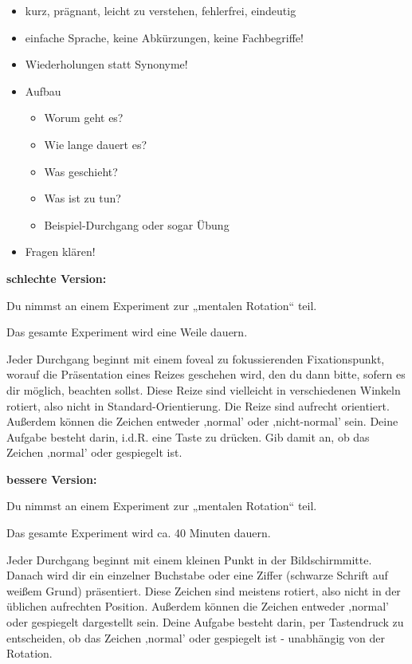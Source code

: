 \documentclass[
]{book}
\begin{document}
\begin{itemize}
\item
  kurz, prägnant, leicht zu verstehen, fehlerfrei, eindeutig
\item
  einfache Sprache, keine Abkürzungen, keine Fachbegriffe!
\item
  Wiederholungen statt Synonyme!
\item
  Aufbau

  \begin{itemize}
  \item
    Worum geht es?
  \item
    Wie lange dauert es?
  \item
    Was geschieht?
  \item
    Was ist zu tun?
  \item
    Beispiel-Durchgang oder sogar Übung
  \end{itemize}
\item
  Fragen klären!
\end{itemize}

\textbf{schlechte Version:}

Du nimmst an einem Experiment zur „mentalen Rotation`` teil.

Das gesamte Experiment wird eine Weile dauern.

Jeder Durchgang beginnt mit einem foveal zu fokussierenden Fixationspunkt, worauf die Präsentation eines Reizes geschehen wird, den du dann bitte, sofern es dir möglich, beachten sollst. Diese Reize
sind vielleicht in verschiedenen Winkeln rotiert, also nicht in Standard-Orientierung. Die Reize sind aufrecht orientiert. Außerdem können
die Zeichen entweder ‚normal' oder ‚nicht-normal' sein.
Deine Aufgabe besteht darin, i.d.R. eine Taste zu drücken.
Gib damit an, ob das Zeichen ‚normal' oder gespiegelt ist.

\textbf{bessere Version:}

Du nimmst an einem Experiment zur „mentalen Rotation`` teil.

Das gesamte Experiment wird ca. 40 Minuten dauern.

Jeder Durchgang beginnt mit einem kleinen Punkt in der Bildschirmmitte. Danach wird dir ein
einzelner Buchstabe oder eine Ziffer (schwarze Schrift auf weißem Grund) präsentiert. Diese
Zeichen sind meistens rotiert, also nicht in der üblichen aufrechten Position. Außerdem können
die Zeichen entweder ‚normal' oder gespiegelt dargestellt sein.
Deine Aufgabe besteht darin, per Tastendruck zu entscheiden,
ob das Zeichen ‚normal' oder gespiegelt ist - unabhängig von der Rotation.
\end{document}
